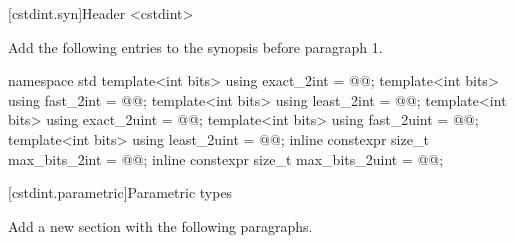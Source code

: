 [cstdint.syn]{Header <cstdint>}

Add the following entries to the synopsis before paragraph 1.

\begin{addedblock}
\begin{codeblock}
namespace std {
  template<int bits> using exact_2int = @\impdefx{}@;
  template<int bits> using fast_2int = @\impdefx{}@;
  template<int bits> using least_2int = @\impdefx{}@;
  template<int bits> using exact_2uint = @\impdefx{}@;
  template<int bits> using fast_2uint = @\impdefx{}@;
  template<int bits> using least_2uint = @\impdefx{}@;
}
inline constexpr size_t max_bits_2int = @\impdefx{}@;
inline constexpr size_t max_bits_2uint = @\impdefx{}@;
\end{codeblock}
\end{addedblock}

[cstdint.parametric]{Parametric types}

Add a new section with the following paragraphs.

